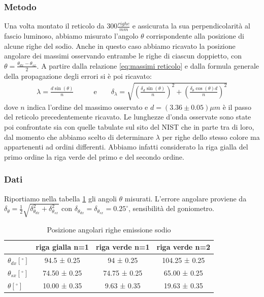 \documentclass[a4paper]{article}
\begin{document}
\subsubsection{Metodo}
Una volta montato il reticolo da $300 \frac{righe}{mm}$ e assicurata la sua perpendicolarità al fascio luminoso, abbiamo misurato l'angolo $\theta$ corrispondente alla posizione di alcune righe del sodio. Anche in questo caso abbiamo ricavato la posizione angolare dei massimi osservando entrambe le righe di ciascun doppietto, con $\theta = \frac{\theta_{dx}-\theta_{sx}}{2}$. A partire dalla relazione \ref{eq:massimi reticolo} e dalla formula generale della propagazione degli errori si è poi ricavato:
\begin{align}
    \lambda = \frac{d\sin(\theta)}{n}  \qquad & \text{e} \qquad \delta_{\lambda} = \sqrt{\left(\frac{\delta_{d}\sin(\theta)}{n}\right)^2 + \left(\frac{\delta_{\theta}\cos(\theta)d}{n}\right)^2}
\label{eq:lambda_sodio}
\end{align}
dove $n$ indica l'ordine del massimo osservato e $d=(3.36\pm 0.05)\mu m$ è il passo del reticolo precedentemente ricavato.
Le lunghezze d'onda osservate sono state poi confrontate sia con quelle tabulate sul sito del NIST che in parte tra di loro, dal momento che abbiamo scelto di determinare $\lambda$ per righe dello stesso colore ma appartenenti ad ordini differenti. Abbiamo infatti considerato la riga gialla del primo ordine la riga verde del primo e del secondo ordine.

\subsubsection{Dati}
Riportiamo nella tabella \ref{tab:angoli.sodio} gli angoli $\theta$ misurati. L'errore angolare proviene da $\delta_{\theta}=\frac{1}{2}\sqrt{\delta_{\theta_{dx}}^2+\delta_{\theta_{sx}}^2}$ con 
$\delta_{\theta_{dx}} =\delta_{\theta_{sx}}= 0.25^\circ$, sensibilità del goniometro.

\begin{table}[htbp]
\centering
\begin{tabular}{|l|c|c|c|}
\hline
 & riga gialla n=1 & riga verde n=1 & riga verde n=2 \\\hline
$\theta_{dx} [^\circ] $ & 94.5 ± 0.25 & 94 ± 0.25 & 104.25 ± 0.25  \\\hline
$\theta_{sx} [^\circ]$ &74.50 ± 0.25 & 74.75 ± 0.25 & 65.00 ± 0.25 \\\hline
$\theta [^\circ]$ &  10.00 ± 0.35 & 9.63 ± 0.35 & 19.63 ± 0.35 \\\hline
\end{tabular}
\caption{Posizione angolari righe emissione sodio}
\label{tab:angoli.sodio}
\end{table}
\end{document}
